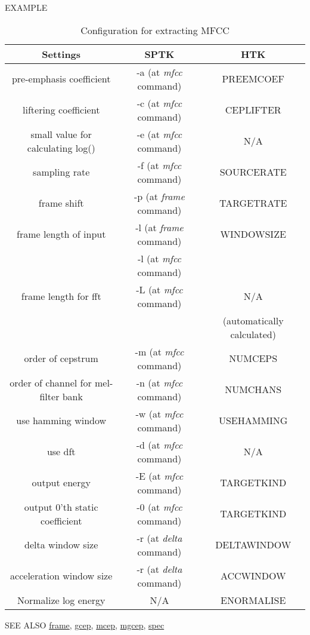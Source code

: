 \begin{qsection}{EXAMPLE}
\setcounter{table}{1}
\begin{table}
        \caption{Configuration for extracting MFCC}
        \label{tbl:mfcc_config}
        \setlength{\arrayrulewidth}{0.5pt}
        \renewcommand{\arraystretch}{1.2}
        \begin{center}
        \begin{tabular}{|c||c|c|} \hline
        Settings                          & SPTK  & HTK \\ \hline\hline
        pre-emphasis coefficient             & -a (at {\em mfcc} command)& PREEMCOEF \\ \hline
        liftering coefficient                & -c (at {\em mfcc} command) & CEPLIFTER \\ \hline
        small value for calculating log()    & -e (at {\em mfcc} command)& N/A \\ \hline
        sampling rate                        & -f (at {\em mfcc} command)& SOURCERATE \\ \hline
        frame shift                          & -p (at {\em frame} command) & TARGETRATE \\ \hline
        frame length of input                & -l (at {\em frame} command) & WINDOWSIZE \\ 
                                             & -l (at {\em mfcc} command)&  \\ \hline
        frame length for fft                 & -L (at {\em mfcc} command)& N/A \\
                                             &    & (automatically calculated) \\ \hline
        order of cepstrum                    & -m (at {\em mfcc} command)& NUMCEPS \\ \hline
        order of channel for mel-filter bank & -n (at {\em mfcc} command)& NUMCHANS \\ \hline
        use hamming window                   & -w (at {\em mfcc} command)& USEHAMMING \\ \hline
        use dft                              & -d (at {\em mfcc} command)& N/A \\ \hline
        output energy                        & -E (at {\em mfcc} command)& TARGETKIND \\ \hline
        output $0$'th static coefficient     & -0 (at {\em mfcc} command)& TARGETKIND \\ \hline 
        delta window size                    & -r (at {\em delta} command)& DELTAWINDOW \\ \hline
        acceleration window size             & -r (at {\em delta} command)& ACCWINDOW \\ \hline
        Normalize log energy                 & N/A & ENORMALISE \\  
        \hline
        \end{tabular}
        \end{center}
\label{tbl:mfcc_config}
\end{table}
\end{qsection}

\begin{qsection}{SEE ALSO}
\hyperlink{frame}{frame},
\hyperlink{gcep}{gcep},
\hyperlink{mcep}{mcep},
\hyperlink{mgcep}{mgcep},
\hyperlink{spec}{spec}
\end{qsection}
